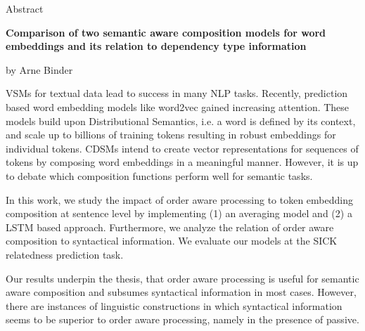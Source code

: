 
\begin{center}
	\huge{Abstract} 
	\vspace{0.5cm}
	 
	\large{\bf{Comparison of two semantic aware composition models for word embeddings and its relation to dependency type information}} 
	\vspace{0.5cm}

	by Arne Binder \\
\end{center}

\vspace{0.5cm}
\normalsize

\acfp{VSM} for textual data lead to success in many \ac{NLP} tasks. Recently, prediction based word embedding models like word2vec %
gained increasing attention. These models build upon Distributional Semantics, i.e. a word is defined by its context, and scale up to billions of training tokens %
resulting in robust embeddings for individual tokens. 
\acfp{CDSM} intend to create vector representations for sequences of tokens by composing word embeddings in a meaningful manner. However, it is up to debate which composition functions perform well for semantic tasks.

In this work, we study the impact of order aware processing to token embedding composition at sentence level by implementing (1) an averaging model and (2) a \ac{LSTM} based approach. Furthermore, we analyze the relation of order aware composition to syntactical information. We evaluate our models at the SICK relatedness prediction task.%

Our results underpin the thesis, that order aware processing is useful for semantic aware composition and subsumes syntactical information in most cases. However, there are instances of linguistic constructions in which syntactical information seems to be superior to order aware processing, namely in the presence of passive.

